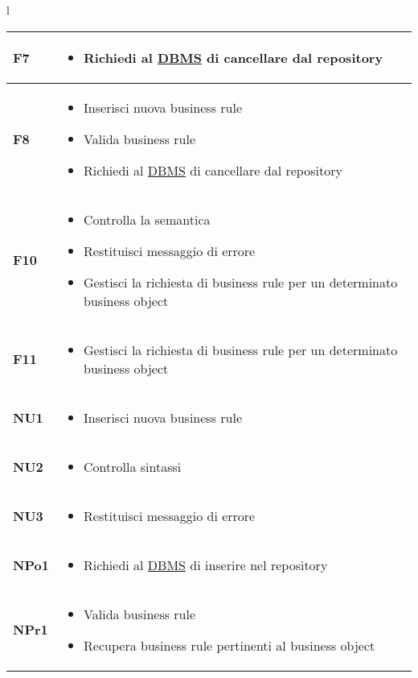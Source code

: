 {\begin{tabular}{l}
\begin{tabular}{||p{2cm}||p{10cm}||} \hline
\textbf{F7} & \begin{itemize}
\item Richiedi al \underline{DBMS} di cancellare dal repository
\end{itemize}\\ \hline


\textbf{F8} & \begin{itemize}
\item Inserisci nuova business rule
\item Valida business rule
\item Richiedi al \underline{DBMS} di cancellare dal repository
\end{itemize} \\ \hline
\textbf{F10} & \begin{itemize}
\item Controlla la semantica
\item Restituisci messaggio di errore
\item Gestisci la richiesta di business rule per un determinato business object
\end{itemize} \\ \hline
\textbf{F11} & \begin{itemize}
\item Gestisci la richiesta di business rule per un determinato business object
\end{itemize} \\ \hline
\textbf{NU1} & \begin{itemize}
\item Inserisci nuova business rule
\end{itemize} \\ \hline
\textbf{NU2} & \begin{itemize}
\item Controlla sintassi
\end{itemize} \\ \hline
\textbf{NU3} & \begin{itemize}
\item Restituisci messaggio di errore
\end{itemize} \\ \hline
\textbf{NPo1} & \begin{itemize}
\item Richiedi al \underline{DBMS} di inserire nel repository
\end{itemize} \\ \hline
\textbf{NPr1} & \begin{itemize}
\item Valida business rule
\item Recupera business rule pertinenti al business object
\end{itemize} \\ \hline


\end{tabular}
\end{tabular}}
